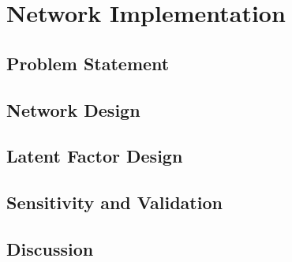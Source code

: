 
\chapter{Network Implementation}
\label{ch:04implement}

\section{Problem Statement}
\label{sec:prob}

\section{Network Design}
\label{sec:networkd}

\section{Latent Factor Design}
\label{sec:factord}

\section{Sensitivity and Validation}
\label{sec:valid}

\section{Discussion}
\label{sec:discuss04}